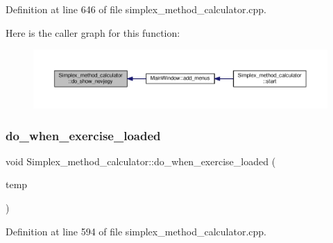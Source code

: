 Definition at line 646 of file simplex\+\_\+method\+\_\+calculator.\+cpp.

Here is the caller graph for this function\+:\nopagebreak
\begin{figure}[H]
\begin{center}
\leavevmode
\includegraphics[width=350pt]{classSimplex__method__calculator_a6c4492e8a18bc5abefba6f0f9eb2ecba_icgraph}
\end{center}
\end{figure}
\mbox{\label{classSimplex__method__calculator_a60dca1c8d54ea44325bbefad572d01a2}} 
\subsubsection{\texorpdfstring{do\+\_\+when\+\_\+exercise\+\_\+loaded}{do\_when\_exercise\_loaded}}
{\footnotesize\ttfamily void Simplex\+\_\+method\+\_\+calculator\+::do\+\_\+when\+\_\+exercise\+\_\+loaded (\begin{DoxyParamCaption}\item[{Q\+Standard\+Item\+Model $\ast$}]{temp }\end{DoxyParamCaption})\hspace{0.3cm}{\ttfamily [slot]}}



Definition at line 594 of file simplex\+\_\+method\+\_\+calculator.\+cpp.

